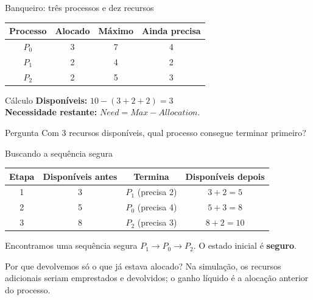 \documentclass[aspectratio=169,11pt]{beamer}
\begin{document}
\begin{frame}{Banqueiro: três processos e dez recursos}
\small
\begin{center}
\begin{tabular}{cccc}
\toprule
\textbf{Processo} & \textbf{Alocado} & \textbf{Máximo} & \textbf{Ainda precisa}\\
\midrule
$P_0$ & 3 & 7 & 4\\
$P_1$ & 2 & 4 & 2\\
$P_2$ & 2 & 5 & 3\\
\bottomrule
\end{tabular}
\end{center}
\vspace{.25cm}
\begin{block}{Cálculo}
\textbf{Disponíveis:} $10-(3+2+2)=3$\\
\textbf{Necessidade restante:} $Need=Max-Allocation$.
\end{block}
\begin{alertblock}{Pergunta}
Com 3 recursos disponíveis, qual processo consegue terminar primeiro?
\end{alertblock}
\end{frame}

\begin{frame}{Buscando a sequência segura}
\small
\begin{center}
\begin{tabular}{cccc}
\toprule
\textbf{Etapa} & \textbf{Disponíveis antes} & \textbf{Termina} & \textbf{Disponíveis depois}\\
\midrule
1 & 3 & $P_1$ (precisa 2) & $3+2=5$\\
2 & 5 & $P_0$ (precisa 4) & $5+3=8$\\
3 & 8 & $P_2$ (precisa 3) & $8+2=10$\\
\bottomrule
\end{tabular}
\end{center}
\vspace{.3cm}
\begin{exampleblock}{Encontramos uma sequência segura}
$P_1\rightarrow P_0\rightarrow P_2$. O estado inicial é \textbf{seguro}.
\end{exampleblock}
\begin{block}{Por que devolvemos só o que já estava alocado?}
Na simulação, os recursos adicionais seriam emprestados e devolvidos; o ganho líquido é a alocação anterior do processo.
\end{block}
\end{frame}
\end{document}
